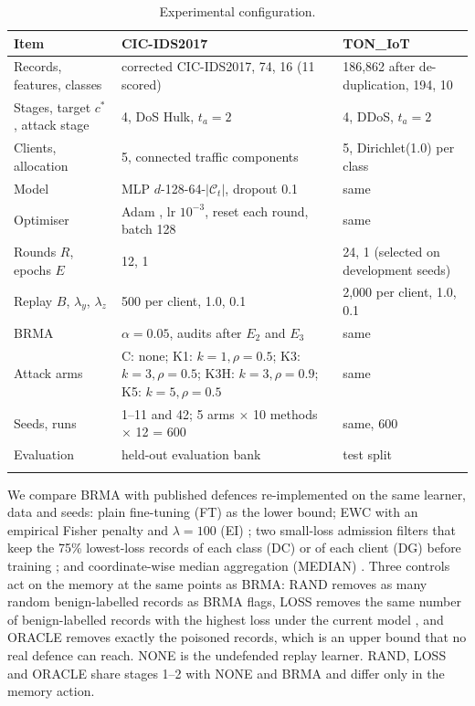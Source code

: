 \documentclass[pdflatex,sn-mathphys-num]{sn-jnl}
\theoremstyle{thmstyleone}
\theoremstyle{thmstylethree}
\begin{document}
\begin{table}[htbp]
\caption{Experimental configuration.}\label{tab:config}
\footnotesize
\begin{tabularx}{\textwidth}{@{}lYY@{}}
\toprule
Item & CIC-IDS2017 & TON\_IoT\\
\midrule
Records, features, classes & corrected CIC-IDS2017, 74, 16 (11 scored) & 186{,}862 after de-duplication, 194, 10\\
Stages, target $c^\ast$, attack stage & 4, DoS Hulk, $t_a=2$ & 4, DDoS, $t_a=2$\\
Clients, allocation & 5, connected traffic components & 5, Dirichlet(1.0) per class\\
Model & MLP $d$-128-64-$|\mathcal{C}_t|$, dropout 0.1 & same\\
Optimiser & Adam \cite{adam}, lr $10^{-3}$, reset each round, batch 128 & same\\
Rounds $R$, epochs $E$ & 12, 1 & 24, 1 (selected on development seeds)\\
Replay $B$, $\lambda_y$, $\lambda_z$ & 500 per client, 1.0, 0.1 & 2{,}000 per client, 1.0, 0.1\\
BRMA & $\alpha=0.05$, audits after $E_2$ and $E_3$ & same\\
Attack arms & C: none; K1: $k=1,\rho=0.5$; K3: $k=3,\rho=0.5$; K3H: $k=3,\rho=0.9$; K5: $k=5,\rho=0.5$ & same\\
Seeds, runs & 1--11 and 42; 5 arms $\times$ 10 methods $\times$ 12 = 600 & same, 600\\
Evaluation & held-out evaluation bank & test split\\
\botrule
\end{tabularx}
\end{table}

We compare BRMA with published defences re-implemented on the same learner, data and seeds: plain fine-tuning (FT) as the lower bound; EWC with an empirical Fisher penalty and $\lambda=100$ (EI) \cite{ewc}; two small-loss admission filters that keep the 75\% lowest-loss records of each class (DC) or of each client (DG) before training \cite{itlm,coteach}; and coordinate-wise median aggregation (MEDIAN) \cite{yin}. Three controls act on the memory at the same points as BRMA: RAND removes as many random benign-labelled records as BRMA flags, LOSS removes the same number of benign-labelled records with the highest loss under the current model \cite{song}, and ORACLE removes exactly the poisoned records, which is an upper bound that no real defence can reach. NONE is the undefended replay learner. RAND, LOSS and ORACLE share stages 1--2 with NONE and BRMA and differ only in the memory action.
\end{document}
